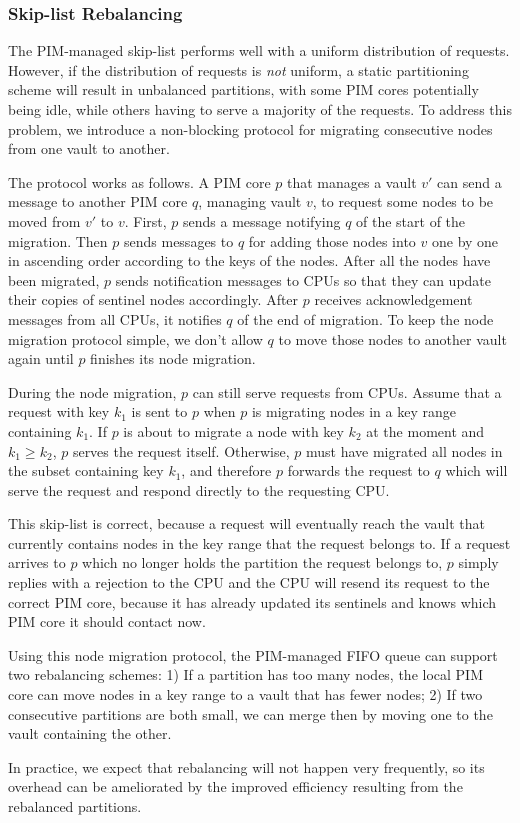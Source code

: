 \subsubsection{Skip-list Rebalancing}
The PIM-managed skip-list performs well with a uniform distribution of requests.
However, if the distribution of requests is \emph{not} uniform, a static partitioning scheme 
will result in unbalanced partitions, with some PIM cores potentially being idle, while others having to 
serve a majority of the requests. To address this problem, we introduce a non-blocking protocol for 
migrating consecutive nodes from one vault to another. 

The protocol works as follows.  A PIM core $p$ that manages a vault
$v'$ can send a message to another PIM core $q$, managing vault $v$,
to request some nodes to be moved from $v'$ to $v$.  First, $p$ sends
a message notifying $q$ of the start of the migration.  Then $p$ sends
messages to $q$ for adding those nodes into $v$ one by one in
ascending order according to the keys of the nodes.  After all the
nodes have been migrated, $p$ sends notification messages to CPUs so
that they can update their copies of sentinel nodes accordingly.
After $p$ receives acknowledgement messages from all CPUs, it notifies
$q$ of the end of migration.  To keep the node migration protocol
simple, we don't allow $q$ to move those nodes to another vault again
until $p$ finishes its node migration.

During the node migration, $p$ can still serve requests from CPUs.
Assume that a request with key $k_1$ is sent to $p$ when $p$ is migrating nodes 
in a key range containing $k_1$.  
If $p$ is about to migrate a node with key $k_2$ at the moment and $k_1 \ge k_2$, 
$p$ serves the request itself. 
Otherwise, $p$ must have migrated all nodes in the subset containing key $k_1$, and therefore $p$ 
forwards the request to $q$ which will serve the request and respond directly to the requesting CPU. 

This skip-list is correct, because a request will eventually reach the vault that 
currently contains nodes in the key range that the request belongs to. 
If a request arrives to $p$ which no longer holds the partition the request belongs to, 
$p$ simply replies with a rejection to the CPU and the CPU will resend its request to 
the correct PIM core, 
because it has already updated its sentinels and knows which PIM core it should contact now. 

Using this node migration protocol, the PIM-managed FIFO queue can support two rebalancing schemes:
1) If a partition has too many nodes, the local PIM core can move nodes in a key range to a vault 
that has fewer nodes;
2) If two consecutive partitions are both small, 
we can merge then by moving one to the vault containing the other. 

In practice, we expect that rebalancing will not happen very frequently, so its overhead can be 
ameliorated by the improved efficiency resulting from the rebalanced partitions. 

